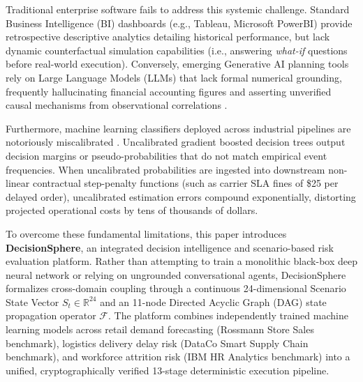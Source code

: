 \documentclass[journal]{IEEEtran}
\begin{document}
Traditional enterprise software fails to address this systemic challenge. Standard Business Intelligence (BI) dashboards (e.g., Tableau, Microsoft PowerBI) provide retrospective descriptive analytics detailing historical performance, but lack dynamic counterfactual simulation capabilities (i.e., answering \textit{what-if} questions before real-world execution). Conversely, emerging Generative AI planning tools rely on Large Language Models (LLMs) that lack formal numerical grounding, frequently hallucinating financial accounting figures and asserting unverified causal mechanisms from observational correlations \cite{shmueli2010explain}.

Furthermore, machine learning classifiers deployed across industrial pipelines are notoriously miscalibrated \cite{guo2017calibration}. Uncalibrated gradient boosted decision trees output decision margins or pseudo-probabilities that do not match empirical event frequencies. When uncalibrated probabilities are ingested into downstream non-linear contractual step-penalty functions (such as carrier SLA fines of \$25 per delayed order), uncalibrated estimation errors compound exponentially, distorting projected operational costs by tens of thousands of dollars.

To overcome these fundamental limitations, this paper introduces \textbf{DecisionSphere}, an integrated decision intelligence and scenario-based risk evaluation platform. Rather than attempting to train a monolithic black-box deep neural network or relying on ungrounded conversational agents, DecisionSphere formalizes cross-domain coupling through a continuous 24-dimensional Scenario State Vector $S_t \in \mathbb{R}^{24}$ and an 11-node Directed Acyclic Graph (DAG) state propagation operator $\mathcal{F}$. The platform combines independently trained machine learning models across retail demand forecasting (Rossmann Store Sales benchmark), logistics delivery delay risk (DataCo Smart Supply Chain benchmark), and workforce attrition risk (IBM HR Analytics benchmark) into a unified, cryptographically verified 13-stage deterministic execution pipeline.
\end{document}

